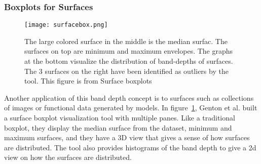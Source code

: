 \documentclass[../main.tex]{subfiles}
\begin{document}
\subsubsection{Boxplots for Surfaces}
\begin{figure}
  \texttt{[image: surfacebox.png]}
  \caption{The large colored surface in the middle is the median surfac. The surfaces on top are minimum and maximum envelopes. The graphs at the bottom visualize the distribution of band-depths of surfaces. The 3 surfaces on the right have been identified as outliers by the tool. This figure is from Surface boxplots \cite{genton_surface_2014}}
  \label{fig:surface}
\end{figure}
Another application of this band depth concept is to surfaces such as collections of images or functional data generated by models. In figure~\ref{fig:surface}, Genton et al. built a surface boxplot visualization tool with multiple panes\cite{genton_surface_2014}. Like a traditional boxplot, they display the median surface from the dataset, minimum and maximum surfaces, and they have a 3D view that gives a sense of how surfaces are distributed. The tool also provides histograms of the band depth to give a 2d view on how the surfaces are distributed.
\end{document}
